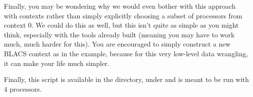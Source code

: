 Finally, you may be wondering why we would even bother with this approach with contexts rather than simply explicitly choosing a subset of processors from context 0.  We could do this as well, but this isn't quite as simple as you might think, especially with the tools already built (meaning you may have to work much, much harder for this).  You are encouraged to simply construct a new BLACS context as in the example, because for this very low-level data wrangling, it can make your life much simpler.

Finally, this script is available in the  directory, under  and is meant to be run with 4 processors.